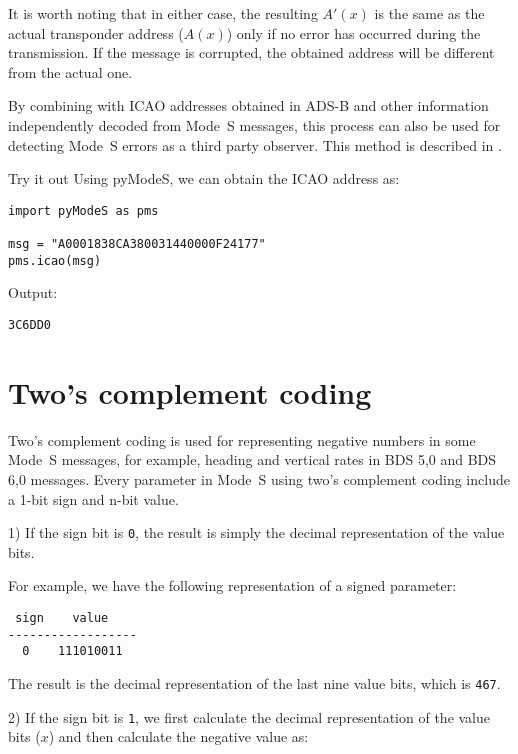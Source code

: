 It is worth noting that in either case, the resulting $A'(x)$ is the same as the actual transponder address ($A(x)$) only if no error has occurred during the transmission. If the message is corrupted, the obtained address will be different from the actual one.

By combining with ICAO addresses obtained in ADS-B and other information independently decoded from Mode~S messages, this process can also be used for detecting Mode~S errors as a third party observer. This method is described in \cite{sun2019pymodes}.

\begin{notebox}{Try it out}
Using pyModeS, we can obtain the ICAO address as: 

\begin{verbatim}
import pyModeS as pms

msg = "A0001838CA380031440000F24177"
pms.icao(msg)
\end{verbatim}

Output: 

\begin{verbatim}
3C6DD0
\end{verbatim}

\end{notebox}

\section{Two's complement coding} \label{sec:two_complement}

Two's complement coding is used for representing negative numbers in some Mode~S messages, for example, heading and vertical rates in BDS 5,0 and BDS 6,0 messages. Every parameter in Mode~S using two's complement coding include a 1-bit sign and n-bit value.

1) If the sign bit is \texttt{0}, the result is simply the decimal representation of the value bits.

For example, we have the following representation of a signed parameter:

\begin{verbatim}
 sign    value
------------------
  0    111010011
\end{verbatim}

The result is the decimal representation of the last nine value bits, which is \texttt{467}.


2) If the sign bit is \texttt{1}, we first calculate the decimal representation of the value bits ($x$) and then calculate the negative value as:

